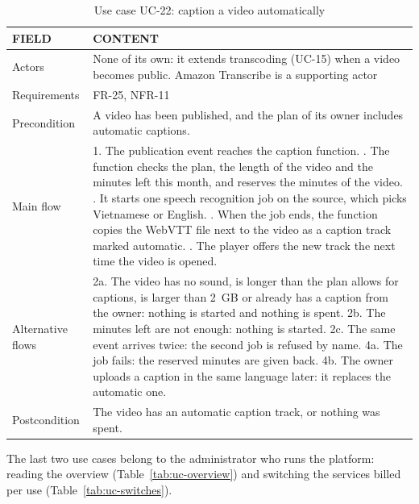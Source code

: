 \begin{table}[H]
\centering
\caption{Use case UC-22: caption a video automatically}
\label{tab:uc-auto-captions}
\small
\begin{tabularx}{\textwidth}{p{} X}
\toprule
\textbf{FIELD} & \textbf{CONTENT} \\
\midrule
Actors & None of its own: it extends transcoding (UC-15) when a video becomes public. Amazon Transcribe is a supporting actor \\
Requirements & FR-25, NFR-11 \\
Precondition & A video has been published, and the plan of its owner includes automatic captions. \\
Main flow &
  1. The publication event reaches the caption function. \newline
  2. The function checks the plan, the length of the video and the minutes left this month, and reserves the minutes of the video. \newline
  3. It starts one speech recognition job on the source, which picks Vietnamese or English. \newline
  4. When the job ends, the function copies the WebVTT file next to the video as a caption track marked automatic. \newline
  5. The player offers the new track the next time the video is opened. \\
Alternative flows &
  2a. The video has no sound, is longer than the plan allows for captions, is larger than 2~GB or already has a caption from the owner: nothing is started and nothing is spent. \newline
  2b. The minutes left are not enough: nothing is started. \newline
  2c. The same event arrives twice: the second job is refused by name. \newline
  4a. The job fails: the reserved minutes are given back. \newline
  4b. The owner uploads a caption in the same language later: it replaces the automatic one. \\
Postcondition & The video has an automatic caption track, or nothing was spent. \\
\bottomrule
\end{tabularx}
\end{table}

The last two use cases belong to the administrator who runs the platform: reading the overview
(Table~\ref{tab:uc-overview}) and switching the services billed per use (Table~\ref{tab:uc-switches}).

